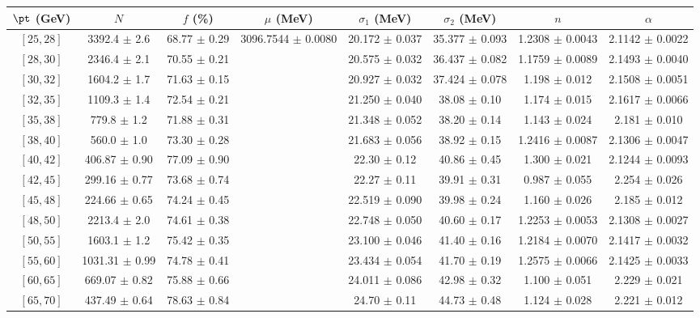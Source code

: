 \begin{tabular}{c||c|c|c|c|c|c|c}
$\pt$ (GeV) & $N$ & $f$ (\%) & $\mu$ (MeV) & $\sigma_1$ (MeV) & $\sigma_2$ (MeV) & $n$ & $\alpha$ \\
\hline
$[25, 28]$ & 3392.4 $\pm$ 2.6 & 68.77 $\pm$ 0.29 & \multirow{19}{*}{3096.7544 $\pm$ 0.0080} & 20.172 $\pm$ 0.037 & 35.377 $\pm$ 0.093 & 1.2308 $\pm$ 0.0043 & 2.1142 $\pm$ 0.0022\\
$[28, 30]$ & 2346.4 $\pm$ 2.1 & 70.55 $\pm$ 0.21 &  & 20.575 $\pm$ 0.032 & 36.437 $\pm$ 0.082 & 1.1759 $\pm$ 0.0089 & 2.1493 $\pm$ 0.0040\\
$[30, 32]$ & 1604.2 $\pm$ 1.7 & 71.63 $\pm$ 0.15 &  & 20.927 $\pm$ 0.032 & 37.424 $\pm$ 0.078 & 1.198 $\pm$ 0.012 & 2.1508 $\pm$ 0.0051\\
$[32, 35]$ & 1109.3 $\pm$ 1.4 & 72.54 $\pm$ 0.21 &  & 21.250 $\pm$ 0.040 & 38.08 $\pm$ 0.10 & 1.174 $\pm$ 0.015 & 2.1617 $\pm$ 0.0066\\
$[35, 38]$ & 779.8 $\pm$ 1.2 & 71.88 $\pm$ 0.31 &  & 21.348 $\pm$ 0.052 & 38.20 $\pm$ 0.14 & 1.143 $\pm$ 0.024 & 2.181 $\pm$ 0.010\\
$[38, 40]$ & 560.0 $\pm$ 1.0 & 73.30 $\pm$ 0.28 &  & 21.683 $\pm$ 0.056 & 38.92 $\pm$ 0.15 & 1.2416 $\pm$ 0.0087 & 2.1306 $\pm$ 0.0047\\
$[40, 42]$ & 406.87 $\pm$ 0.90 & 77.09 $\pm$ 0.90 &  & 22.30 $\pm$ 0.12 & 40.86 $\pm$ 0.45 & 1.300 $\pm$ 0.021 & 2.1244 $\pm$ 0.0093\\
$[42, 45]$ & 299.16 $\pm$ 0.77 & 73.68 $\pm$ 0.74 &  & 22.27 $\pm$ 0.11 & 39.91 $\pm$ 0.31 & 0.987 $\pm$ 0.055 & 2.254 $\pm$ 0.026\\
$[45, 48]$ & 224.66 $\pm$ 0.65 & 74.24 $\pm$ 0.45 &  & 22.519 $\pm$ 0.090 & 39.98 $\pm$ 0.24 & 1.160 $\pm$ 0.026 & 2.185 $\pm$ 0.012\\
$[48, 50]$ & 2213.4 $\pm$ 2.0 & 74.61 $\pm$ 0.38 &  & 22.748 $\pm$ 0.050 & 40.60 $\pm$ 0.17 & 1.2253 $\pm$ 0.0053 & 2.1308 $\pm$ 0.0027\\
$[50, 55]$ & 1603.1 $\pm$ 1.2 & 75.42 $\pm$ 0.35 &  & 23.100 $\pm$ 0.046 & 41.40 $\pm$ 0.16 & 1.2184 $\pm$ 0.0070 & 2.1417 $\pm$ 0.0032\\
$[55, 60]$ & 1031.31 $\pm$ 0.99 & 74.78 $\pm$ 0.41 &  & 23.434 $\pm$ 0.054 & 41.70 $\pm$ 0.19 & 1.2575 $\pm$ 0.0066 & 2.1425 $\pm$ 0.0033\\
$[60, 65]$ & 669.07 $\pm$ 0.82 & 75.88 $\pm$ 0.66 &  & 24.011 $\pm$ 0.086 & 42.98 $\pm$ 0.32 & 1.100 $\pm$ 0.051 & 2.229 $\pm$ 0.021\\
$[65, 70]$ & 437.49 $\pm$ 0.64 & 78.63 $\pm$ 0.84 &  & 24.70 $\pm$ 0.11 & 44.73 $\pm$ 0.48 & 1.124 $\pm$ 0.028 & 2.221 $\pm$ 0.012\\

\end{tabular}
